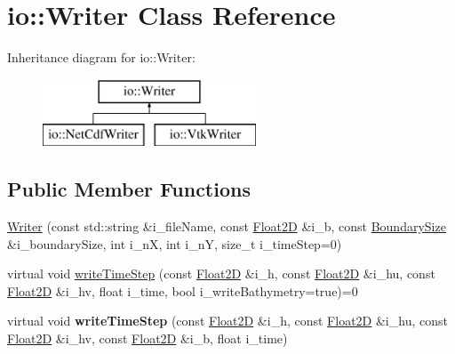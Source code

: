 \hypertarget{classio_1_1Writer}{\section{io\-:\-:Writer Class Reference}
\label{classio_1_1Writer}
}
Inheritance diagram for io\-:\-:Writer\-:\begin{figure}[H]
\begin{center}
\leavevmode
\includegraphics[height=2.000000cm]{classio_1_1Writer}
\end{center}
\end{figure}
\subsection*{Public Member Functions}
\begin{DoxyCompactItemize}
\item 
\hyperlink{classio_1_1Writer_a05648cc3fcfaf3d7d4267a584685f6f3}{Writer} (const std\-::string \&i\-\_\-file\-Name, const \hyperlink{classFloat2D}{Float2\-D} \&i\-\_\-b, const \hyperlink{structio_1_1BoundarySize}{Boundary\-Size} \&i\-\_\-boundary\-Size, int i\-\_\-n\-X, int i\-\_\-n\-Y, size\-\_\-t i\-\_\-time\-Step=0)
\item 
virtual void \hyperlink{classio_1_1Writer_ac0d0cf6466fc05fba32acf22332a8e65}{write\-Time\-Step} (const \hyperlink{classFloat2D}{Float2\-D} \&i\-\_\-h, const \hyperlink{classFloat2D}{Float2\-D} \&i\-\_\-hu, const \hyperlink{classFloat2D}{Float2\-D} \&i\-\_\-hv, float i\-\_\-time, bool i\-\_\-write\-Bathymetry=true)=0
\item 
\hypertarget{classio_1_1Writer_ada10f42d4e639895b4949c736cf3f328}{virtual void {\bfseries write\-Time\-Step} (const \hyperlink{classFloat2D}{Float2\-D} \&i\-\_\-h, const \hyperlink{classFloat2D}{Float2\-D} \&i\-\_\-hu, const \hyperlink{classFloat2D}{Float2\-D} \&i\-\_\-hv, const \hyperlink{classFloat2D}{Float2\-D} \&i\-\_\-b, float i\-\_\-time)}\label{classio_1_1Writer_ada10f42d4e639895b4949c736cf3f328}

\end{DoxyCompactItemize}
